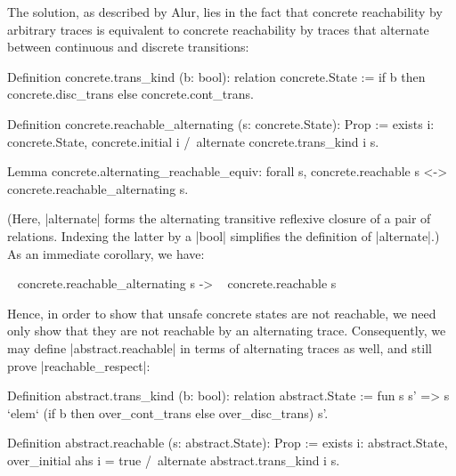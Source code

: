 \documentclass[runningheads]{llncs}
\begin{document}
The solution, as described by Alur, lies in the fact that concrete reachability by arbitrary traces is equivalent to concrete reachability by traces that alternate between continuous and discrete transitions:
\begin{code}
  Definition concrete.trans_kind (b: bool): relation concrete.State :=
    if b then concrete.disc_trans else concrete.cont_trans.

  Definition concrete.reachable_alternating (s: concrete.State): Prop :=
    exists i: concrete.State, concrete.initial i /\ alternate concrete.trans_kind i s.

  Lemma concrete.alternating_reachable_equiv:
    forall s, concrete.reachable s <-> concrete.reachable_alternating s.
\end{code}
(Here, |alternate| forms the alternating transitive reflexive closure of a pair of relations. Indexing the latter by a |bool| simplifies the definition of |alternate|.)  As an immediate corollary, we have:
\begin{code}
  ~ concrete.reachable_alternating s -> ~ concrete.reachable s
\end{code}
Hence, in order to show that unsafe concrete states are not reachable, we need only show that they are not reachable by an alternating trace. Consequently, we may define |abstract.reachable| in terms of alternating traces as well, and still prove |reachable_respect|:
\begin{code}
Definition abstract.trans_kind (b: bool): relation abstract.State :=
  fun s s' => s `elem` (if b then over_cont_trans else over_disc_trans) s'.

Definition abstract.reachable (s: abstract.State): Prop :=
  exists i: abstract.State, over_initial ahs i = true /\ alternate abstract.trans_kind i s.
\end{code}


\end{document}
